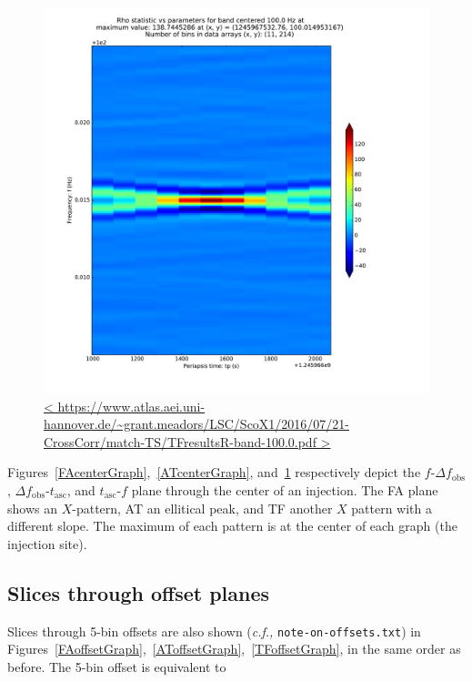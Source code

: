\documentclass{article}
\begin{document}
\begin{figure}
\includegraphics[trim= 0 0 0 0, clip, width=0.80\paperwidth,keepaspectratio]{plots/match-TS/TFresultsR-band-100-0.pdf}
\caption{
\url{<
https://www.atlas.aei.uni-hannover.de/~grant.meadors/LSC/ScoX1/2016/07/21-CrossCorr/match-TS/TFresultsR-band-100.0.pdf
>}
}
\label{TFcenterGraph}
\end{figure}

Figures~\ref{FAcenterGraph},~\ref{ATcenterGraph}, and~\ref{TFcenterGraph} respectively depict the $f$-$\Delta f_\mathrm{obs}$, $\Delta f_\mathrm{obs}$-$t_\mathrm{asc}$, and $t_\mathrm{asc}$-$f$ plane through the center of an injection. 
The FA plane shows an $X$-pattern, AT an ellitical peak, and TF another $X$ pattern with a different slope.
The maximum of each pattern is at the center of each graph (the injection site).

\subsection{Slices through offset planes}

Slices through 5-bin offsets are also shown (\textit{c.f.,} \texttt{note-on-offsets.txt}) in Figures~\ref{FAoffsetGraph},~\ref{AToffsetGraph},~\ref{TFoffsetGraph}, in the same order as before.
The 5-bin offset is equivalent to
\end{document}

